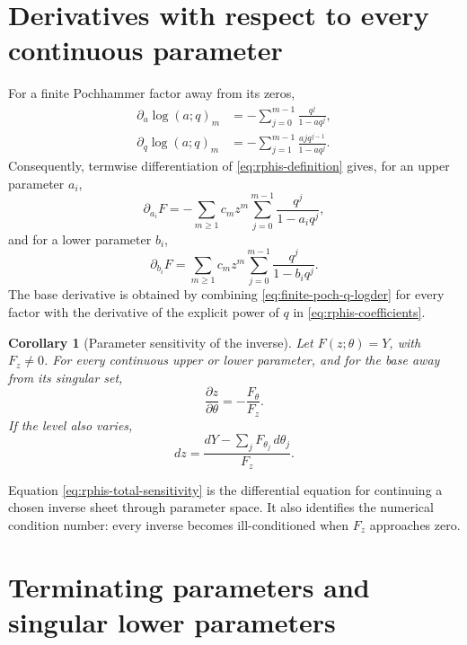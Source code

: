 \documentclass[11pt,a4paper,oneside,openany]{book}
\newtheorem{corollary}[theorem]{Corollary}
\theoremstyle{definition}
\theoremstyle{remark}
\begin{document}
\section{Derivatives with respect to every continuous parameter}

For a finite Pochhammer factor away from its zeros,
\begin{align}
 \partial_a\log(a;q)_m
 &=-\sum_{j=0}^{m-1}\frac{q^j}{1-aq^j},
 \label{eq:finite-poch-a-logder}\\
 \partial_q\log(a;q)_m
 &=-\sum_{j=1}^{m-1}\frac{ajq^{j-1}}{1-aq^j}.
 \label{eq:finite-poch-q-logder}
\end{align}
Consequently, termwise differentiation of \eqref{eq:rphis-definition}
gives, for an upper parameter \(a_i\),
\begin{equation}\label{eq:rphis-upper-derivative}
 \partial_{a_i}F
 =-\sum_{m\ge1}c_mz^m
   \sum_{j=0}^{m-1}\frac{q^j}{1-a_iq^j},
\end{equation}
and for a lower parameter \(b_i\),
\begin{equation}\label{eq:rphis-lower-derivative}
 \partial_{b_i}F
 =\sum_{m\ge1}c_mz^m
   \sum_{j=0}^{m-1}\frac{q^j}{1-b_iq^j}.
\end{equation}
The base derivative is obtained by combining
\eqref{eq:finite-poch-q-logder} for every factor with the derivative of the
explicit power of \(q\) in \eqref{eq:rphis-coefficients}.

\begin{corollary}[Parameter sensitivity of the inverse]\label{cor:rphis-sensitivity}
Let \(F(z;\theta)=Y\), with \(F_z\ne0\).  For every continuous upper or lower
parameter, and for the base away from its singular set,
\begin{equation}\label{eq:rphis-parameter-sensitivity}
 \frac{\partial z}{\partial\theta}=-\frac{F_\theta}{F_z}.
\end{equation}
If the level also varies,
\begin{equation}\label{eq:rphis-total-sensitivity}
 dz=\frac{dY-\sum_jF_{\theta_j}\,d\theta_j}{F_z}.
\end{equation}
\end{corollary}

Equation \eqref{eq:rphis-total-sensitivity} is the differential equation for
continuing a chosen inverse sheet through parameter space.  It also identifies
the numerical condition number: every inverse becomes ill-conditioned when
\(F_z\) approaches zero.

\section{Terminating parameters and singular lower parameters}
\end{document}
